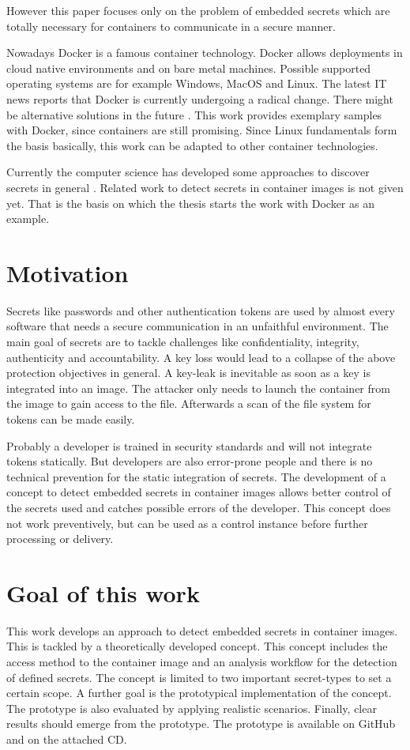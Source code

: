 However this paper focuses only on the problem of embedded secrets which are totally necessary for containers to communicate in a secure manner.

Nowadays Docker is a famous container technology. Docker allows deployments in cloud native environments and on bare metal machines. Possible supported operating systems are for example Windows, MacOS and Linux.
The latest IT news reports that Docker is currently undergoing a radical change. There might be alternative solutions in the future \cite{docker_heise}. This work provides exemplary samples with Docker, since containers are still promising. Since Linux fundamentals form the basis basically, this work can be adapted to other container technologies.

Currently the computer science has developed some approaches to discover secrets in general \cite{7180102}. Related work to detect secrets in container images is not given yet.
That is the basis on which the thesis starts the work with Docker as an example.

%
%
\section{Motivation}
\label{sec:intro:motivation}
Secrets like passwords and other authentication tokens are used by almost every software that needs a secure communication in an unfaithful environment. The main goal of secrets are to tackle challenges like confidentiality, integrity, authenticity and accountability. A key loss would lead to a collapse of the above protection objectives in general. A key-leak is inevitable as soon as a key is integrated into an image.
The attacker only needs to launch the container from the image to gain access to the file. Afterwards a scan of the file system for tokens can be made easily. 

Probably a developer is trained in security standards and will not integrate tokens statically. But developers are also error-prone people and there is no technical prevention for the static integration of secrets. 
The development of a concept to detect embedded secrets in container images allows better control of the secrets used and catches possible errors of the developer. This concept does not work preventively, but can be used as a control instance before further processing or delivery. 
%
%
\section{Goal of this work}
\label{sec:intro:goal}
This work develops an approach to detect embedded secrets in container images. This is tackled by a theoretically developed concept. This concept includes the access method to the container image and an analysis workflow for the detection of defined secrets. The concept is limited to two important secret-types to set a certain scope.
A further goal is the prototypical implementation of the concept. The prototype is also evaluated by applying realistic scenarios.
Finally, clear results should emerge from the prototype. The prototype is available on GitHub and on the attached CD.

